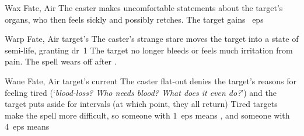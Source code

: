 \ifodd\value{diceNo}
  {}%
  {Wax}%
  {Fate, Air}%
  {}%
  {The caster makes uncomfortable statements about the target's organs, who then feels sickly and possibly retches.
  The target gains ~\glspl{ep}}%
  {}

\else

  {}%
  {Warp}%
  {Fate, Air}%
  {target's }%
  {The caster's strange stare moves the target into a state of semi-life, granting \gls{dr}~1}%
  {
    The target no longer bleeds or feels much irritation from pain.
    The spell wears off after .}

  {}%
  {Wane}%
  {Fate, Air}%
  {target's current }%
  {The caster flat-out denies the target's reasons for feeling tired (`\textit{blood-loss? Who needs blood?  What does it even do?}') and the target puts aside   for  \glspl{interval} (at which point, they all return)}%
  {
  Tired targets make the \gls{spell} more difficult, so someone with 1~\glspl{ep} means \tn[8], and someone with 4~\glspl{ep} means \tn[11]}

\fi
{}
